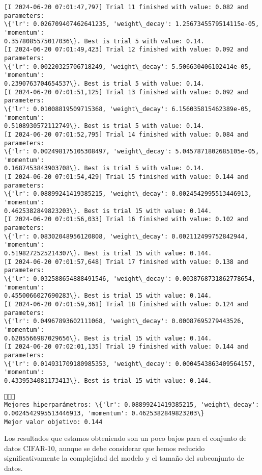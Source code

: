 \documentclass[11pt]{article}
\begin{document}
\begin{Verbatim}[commandchars=\\\{\}]
[I 2024-06-20 07:01:47,797] Trial 11 finished with value: 0.082 and parameters:
\{'lr': 0.026709407462641235, 'weight\_decay': 1.2567345579514115e-05, 'momentum':
0.3578085575017036\}. Best is trial 5 with value: 0.14.
[I 2024-06-20 07:01:49,423] Trial 12 finished with value: 0.092 and parameters:
\{'lr': 0.00220325706718249, 'weight\_decay': 5.506630406102414e-05, 'momentum':
0.2390763704654537\}. Best is trial 5 with value: 0.14.
[I 2024-06-20 07:01:51,125] Trial 13 finished with value: 0.092 and parameters:
\{'lr': 0.01008819509715368, 'weight\_decay': 6.156035815462389e-05, 'momentum':
0.5108930572112749\}. Best is trial 5 with value: 0.14.
[I 2024-06-20 07:01:52,795] Trial 14 finished with value: 0.084 and parameters:
\{'lr': 0.002498175105308497, 'weight\_decay': 5.0457871802685105e-05, 'momentum':
0.1687453843903708\}. Best is trial 5 with value: 0.14.
[I 2024-06-20 07:01:54,429] Trial 15 finished with value: 0.144 and parameters:
\{'lr': 0.08899241419385215, 'weight\_decay': 0.0024542995513446913, 'momentum':
0.4625382849823203\}. Best is trial 15 with value: 0.144.
[I 2024-06-20 07:01:56,033] Trial 16 finished with value: 0.102 and parameters:
\{'lr': 0.08302048956120808, 'weight\_decay': 0.002112499752842944, 'momentum':
0.5198272525214307\}. Best is trial 15 with value: 0.144.
[I 2024-06-20 07:01:57,648] Trial 17 finished with value: 0.138 and parameters:
\{'lr': 0.032588654888491546, 'weight\_decay': 0.0038768731862778654, 'momentum':
0.4550066027690283\}. Best is trial 15 with value: 0.144.
[I 2024-06-20 07:01:59,361] Trial 18 finished with value: 0.124 and parameters:
\{'lr': 0.04967893602111068, 'weight\_decay': 0.00087695279443526, 'momentum':
0.6205566987029656\}. Best is trial 15 with value: 0.144.
[I 2024-06-20 07:02:01,135] Trial 19 finished with value: 0.144 and parameters:
\{'lr': 0.014931709180985353, 'weight\_decay': 0.0004543863409564157, 'momentum':
0.4339534081173413\}. Best is trial 15 with value: 0.144.
    \end{Verbatim}

    \begin{Verbatim}[commandchars=\\\{\}]
🎉🎉🎉
Mejores hiperparámetros: \{'lr': 0.08899241419385215, 'weight\_decay':
0.0024542995513446913, 'momentum': 0.4625382849823203\}
Mejor valor objetivo: 0.144
    \end{Verbatim}

    Los resultados que estamos obteniendo son un poco bajos para el conjunto
de datos CIFAR-10, aunque se debe considerar que hemos reducido
significativamente la complejidad del modelo y el tamaño del subconjunto
de datos.
\end{document}
